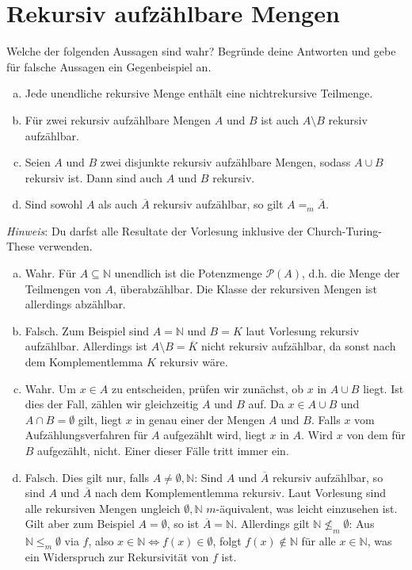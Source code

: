 \documentclass[german,headsepline]{scrartcl}
\begin{document}
	\section{Rekursiv aufzählbare Mengen}
	\begin{question}
		Welche der folgenden Aussagen sind wahr?
		Begründe deine Antworten und gebe für falsche Aussagen ein Gegenbeispiel an.
		\begin{enumerate}[(a)]
			\item Jede unendliche rekursive Menge enthält eine nichtrekursive Teilmenge.
			\item Für zwei rekursiv aufzählbare Mengen $A$ und $B$ ist auch $A\setminus B$ rekursiv aufzählbar.
			\item Seien $A$ und $B$ zwei disjunkte rekursiv aufzählbare Mengen, sodass $A\cup B$ rekursiv ist.
			Dann sind auch $A$ und $B$ rekursiv.
			\item Sind sowohl $A$ als auch $\overline{A}$ rekursiv aufzählbar, so gilt $A=_m\overline{A}$.
		\end{enumerate}
		\textit{Hinweis}: Du darfst alle Resultate der Vorlesung inklusive der Church-Turing-These verwenden.
	\end{question}
	\begin{solution}
		\begin{enumerate}[(a)]
			\item Wahr. Für $A\subseteq\mathbb{N}$ unendlich ist die Potenzmenge $\mathcal{P}(A)$,
				d.h. die Menge der Teilmengen von $A$, überabzählbar.
				Die Klasse der rekursiven Mengen ist allerdings abzählbar.
			\item Falsch. Zum Beispiel sind $A=\mathbb{N}$ und $B=K$ laut Vorlesung rekursiv aufzählbar.
				Allerdings ist $A\setminus B=\overline{K}$ nicht rekursiv aufzählbar,
			da sonst nach dem Komplementlemma $K$ rekursiv wäre.
			\item Wahr. Um $x\in A$ zu entscheiden, prüfen wir zunächst, ob $x$ in $A\cup B$ liegt.
				Ist dies der Fall, zählen wir gleichzeitig $A$ und $B$ auf.
				Da $x\in A\cup B$ und $A\cap B=\emptyset$ gilt, liegt $x$ in genau einer der Mengen $A$ und $B$.
				Falls $x$ vom Aufzählungsverfahren für $A$ aufgezählt wird, liegt $x$ in $A$.
				Wird $x$ von dem für $B$ aufgezählt, nicht. Einer dieser Fälle tritt immer ein.
			\item Falsch. Dies gilt nur, falls $A\neq\emptyset,\mathbb{N}$:
				Sind $A$ und $\overline{A}$ rekursiv aufzählbar,
				so sind $A$ und $\overline{A}$ nach dem Komplementlemma rekursiv.
				Laut Vorlesung sind alle rekursiven Mengen ungleich $\emptyset,\mathbb{N}$ $m$-äquivalent,
				was leicht einzusehen ist. \\
				Gilt aber zum Beispiel $A=\emptyset$, so ist $\overline{A}=\mathbb{N}$.
				Allerdings gilt $\mathbb{N}\not\leq_m\emptyset$:
				Aus $\mathbb{N}\leq_m\emptyset$ via $f$, also $x\in\mathbb{N}\Leftrightarrow f(x)\in\emptyset$,
				folgt $f(x)\not\in\mathbb{N}$ für alle $x\in\mathbb{N}$,
				was ein Widerspruch zur Rekursivität von $f$ ist.
		\end{enumerate}
	\end{solution}
	
\end{document}
